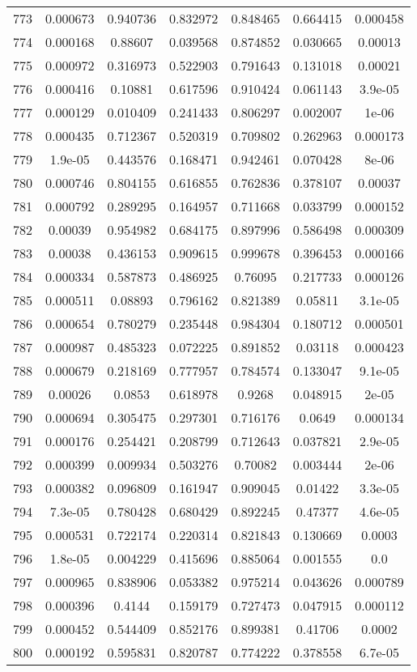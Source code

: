 \begin{table}
\begin{tabular}{c|c|c|c|c|c|c}
773 & 0.000673 & 0.940736 & 0.832972 & 0.848465 & 0.664415 & 0.000458\\
774 & 0.000168 & 0.88607 & 0.039568 & 0.874852 & 0.030665 & 0.00013\\
775 & 0.000972 & 0.316973 & 0.522903 & 0.791643 & 0.131018 & 0.00021\\
776 & 0.000416 & 0.10881 & 0.617596 & 0.910424 & 0.061143 & 3.9e-05\\
777 & 0.000129 & 0.010409 & 0.241433 & 0.806297 & 0.002007 & 1e-06\\
778 & 0.000435 & 0.712367 & 0.520319 & 0.709802 & 0.262963 & 0.000173\\
779 & 1.9e-05 & 0.443576 & 0.168471 & 0.942461 & 0.070428 & 8e-06\\
780 & 0.000746 & 0.804155 & 0.616855 & 0.762836 & 0.378107 & 0.00037\\
781 & 0.000792 & 0.289295 & 0.164957 & 0.711668 & 0.033799 & 0.000152\\
782 & 0.00039 & 0.954982 & 0.684175 & 0.897996 & 0.586498 & 0.000309\\
783 & 0.00038 & 0.436153 & 0.909615 & 0.999678 & 0.396453 & 0.000166\\
784 & 0.000334 & 0.587873 & 0.486925 & 0.76095 & 0.217733 & 0.000126\\
785 & 0.000511 & 0.08893 & 0.796162 & 0.821389 & 0.05811 & 3.1e-05\\
786 & 0.000654 & 0.780279 & 0.235448 & 0.984304 & 0.180712 & 0.000501\\
787 & 0.000987 & 0.485323 & 0.072225 & 0.891852 & 0.03118 & 0.000423\\
788 & 0.000679 & 0.218169 & 0.777957 & 0.784574 & 0.133047 & 9.1e-05\\
789 & 0.00026 & 0.0853 & 0.618978 & 0.9268 & 0.048915 & 2e-05\\
790 & 0.000694 & 0.305475 & 0.297301 & 0.716176 & 0.0649 & 0.000134\\
791 & 0.000176 & 0.254421 & 0.208799 & 0.712643 & 0.037821 & 2.9e-05\\
792 & 0.000399 & 0.009934 & 0.503276 & 0.70082 & 0.003444 & 2e-06\\
793 & 0.000382 & 0.096809 & 0.161947 & 0.909045 & 0.01422 & 3.3e-05\\
794 & 7.3e-05 & 0.780428 & 0.680429 & 0.892245 & 0.47377 & 4.6e-05\\
795 & 0.000531 & 0.722174 & 0.220314 & 0.821843 & 0.130669 & 0.0003\\
796 & 1.8e-05 & 0.004229 & 0.415696 & 0.885064 & 0.001555 & 0.0\\
797 & 0.000965 & 0.838906 & 0.053382 & 0.975214 & 0.043626 & 0.000789\\
798 & 0.000396 & 0.4144 & 0.159179 & 0.727473 & 0.047915 & 0.000112\\
799 & 0.000452 & 0.544409 & 0.852176 & 0.899381 & 0.41706 & 0.0002\\
800 & 0.000192 & 0.595831 & 0.820787 & 0.774222 & 0.378558 & 6.7e-05\\
\end{tabular}
\end{table}
